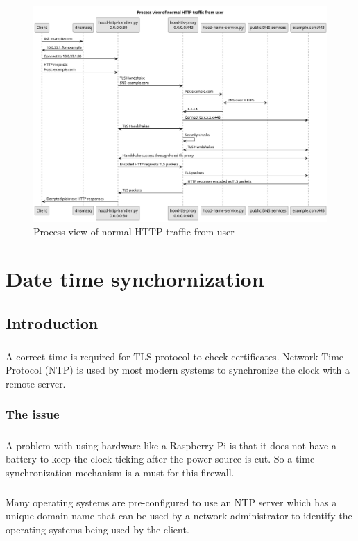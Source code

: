 \documentclass[mscthesis]{usiinfthesis}
\begin{document}
\begin{figure}[H]
  \includegraphics[width=\textheight, angle=90]{graphics/puml/process-http-traffic.png}
  \caption{Process view of normal HTTP traffic from user}
  \label{fig:http-process-view}
\end{figure}

\chapter{Date time synchornization}\label{cha:time}
\section{Introduction}
\paragraph{}
A correct time is required for TLS protocol to check certificates. Network Time Protocol (NTP) is used by most modern systems to synchronize the clock with a remote server.
\subsection{The issue}
\paragraph{}
A problem with using hardware like a Raspberry Pi is that it does not have a battery to keep the clock ticking after the power source is cut. So a time synchronization mechanism is a must for this firewall.
\paragraph{}
Many operating systems are pre-configured to use an NTP server which has a unique domain name that can be used by a network administrator to identify the operating systems being used by the client.
\end{document}
